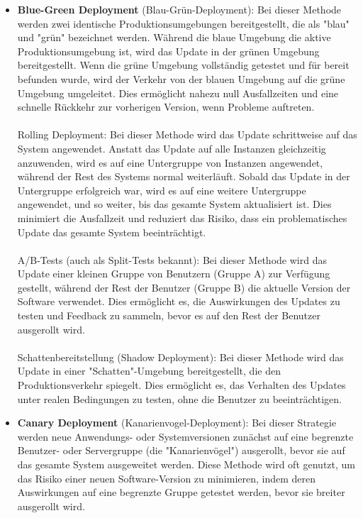 \begin{itemize}
\item \textbf{Blue-Green Deployment} (Blau-Grün-Deployment):
Bei dieser Methode werden zwei identische Produktionsumgebungen bereitgestellt, die als "blau" und "grün" bezeichnet werden. Während die blaue Umgebung die aktive Produktionsumgebung ist, wird das Update in der grünen Umgebung bereitgestellt. Wenn die grüne Umgebung vollständig getestet und für bereit befunden wurde, wird der Verkehr von der blauen Umgebung auf die grüne Umgebung umgeleitet. Dies ermöglicht nahezu null Ausfallzeiten und eine schnelle Rückkehr zur vorherigen Version, wenn Probleme auftreten.
\\\\
Rolling Deployment: Bei dieser Methode wird das Update schrittweise auf das System angewendet. Anstatt das Update auf alle Instanzen gleichzeitig anzuwenden, wird es auf eine Untergruppe von Instanzen angewendet, während der Rest des Systems normal weiterläuft. Sobald das Update in der Untergruppe erfolgreich war, wird es auf eine weitere Untergruppe angewendet, und so weiter, bis das gesamte System aktualisiert ist. Dies minimiert die Ausfallzeit und reduziert das Risiko, dass ein problematisches Update das gesamte System beeinträchtigt.
\\\\
A/B-Tests (auch als Split-Tests bekannt): Bei dieser Methode wird das Update einer kleinen Gruppe von Benutzern (Gruppe A) zur Verfügung gestellt, während der Rest der Benutzer (Gruppe B) die aktuelle Version der Software verwendet. Dies ermöglicht es, die Auswirkungen des Updates zu testen und Feedback zu sammeln, bevor es auf den Rest der Benutzer ausgerollt wird.
\\\\
Schattenbereitstellung (Shadow Deployment): Bei dieser Methode wird das Update in einer "Schatten"-Umgebung bereitgestellt, die den Produktionsverkehr spiegelt. Dies ermöglicht es, das Verhalten des Updates unter realen Bedingungen zu testen, ohne die Benutzer zu beeinträchtigen.
\item \textbf{Canary Deployment} (Kanarienvogel-Deployment):
Bei dieser Strategie werden neue Anwendungs- oder Systemversionen zunächst auf eine begrenzte Benutzer- oder Servergruppe (die "Kanarienvögel") ausgerollt, bevor sie auf das gesamte System ausgeweitet werden. Diese Methode wird oft genutzt, um das Risiko einer neuen Software-Version zu minimieren, indem deren Auswirkungen auf eine begrenzte Gruppe getestet werden, bevor sie breiter ausgerollt wird.
\\\\

\end{itemize}
